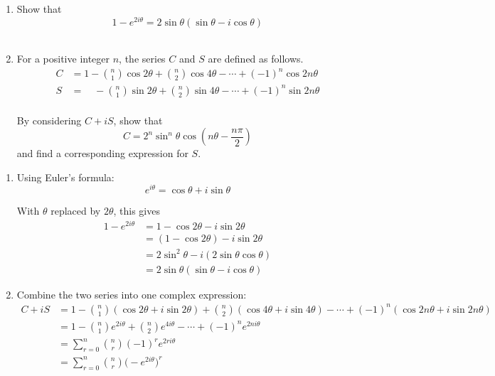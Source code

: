 \documentclass[leqno]{article}
\begin{document}
\begin{enumerate}[
  label=\textbf{\arabic*.},
  leftmargin=*,
  topsep=0pt,
  partopsep=0pt,
  parsep=0pt
]
\newpage

\questionitem

\begin{enumerate}[label=\textbf{(\roman*)}]
  \item Show that
  \[
  1 - e^{2i\theta} = 2\sin\theta(\sin\theta - i\cos\theta)
  \] \\
  \item For a positive integer $n$, the series $C$ and $S$ are defined as follows.
  \begin{align*}
  C &= 1 - \binom{n}{1}\cos 2\theta + \binom{n}{2}\cos 4\theta - \cdots + (-1)^n\cos 2n\theta \\[5pt]
  S &=\quad -\binom{n}{1}\sin 2\theta + \binom{n}{2}\sin 4\theta - \cdots + (-1)^n\sin 2n\theta
  \end{align*} \\
  By considering $C + iS$, show that
  \[
  C = 2^n\sin^n\theta\cos\left(n\theta - \frac{n\pi}{2}\right)
  \]
  and find a corresponding expression for $S$. \\
\end{enumerate}

\vspace*{10pt}

\begin{djsSolution}
\begin{enumerate}[label=\textbf{(\roman*)}]
  \item Using Euler's formula:
\[
e^{i\theta}=\cos\theta+i\sin\theta
\]

With \(\theta\) replaced by \(2\theta\), this gives
\begin{align*}
1-e^{2i\theta}
&=1-\cos 2\theta-i\sin 2\theta\\
&=(1-\cos 2\theta)-i\sin 2\theta\\
&=2\sin^2\theta-i(2\sin\theta\cos\theta)\\
&=2\sin\theta(\sin\theta-i\cos\theta)
\end{align*}
  \item Combine the two series into one complex expression:
\begin{align*}
C+iS
&=1-\binom{n}{1}(\cos 2\theta+i\sin 2\theta)+\binom{n}{2}(\cos 4\theta+i\sin 4\theta)-\cdots+(-1)^n(\cos 2n\theta+i\sin 2n\theta)\\
&=1-\binom{n}{1}e^{2i\theta}+\binom{n}{2}e^{4i\theta}-\cdots+(-1)^n e^{2ni\theta}\\
&=\sum_{r=0}^{n}\binom{n}{r}(-1)^r e^{2ri\theta}\\
&=\sum_{r=0}^{n}\binom{n}{r}\bigl(-e^{2i\theta}\bigr)^r
\end{align*}


\end{enumerate}
\end{djsSolution}
\end{enumerate}
\end{document}
